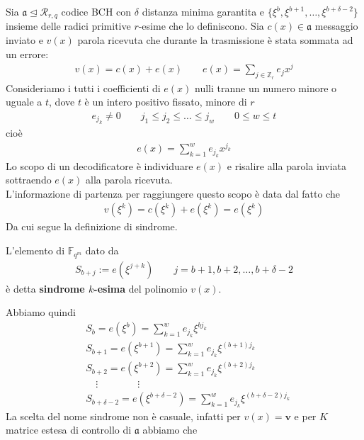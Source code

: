 Sia $\mathfrak{a} \trianglelefteq  \mathcal{R}_{r,q} $ codice BCH con $\delta$ distanza minima garantita e $\lbrace \xi^{b}, \xi^{b+1}, \dots , \xi^{b + \delta - 2} \rbrace$ insieme delle radici primitive $r$-esime che lo definiscono. Sia $c(x) \in \mathfrak{a}$ messaggio inviato e $v(x)$ parola ricevuta che durante la trasmissione è stata sommata ad un errore:
\begin{align*}
   v(x) = c(x) + e(x) \qquad e(x) = \sum_{j \in \mathbb{Z}_{r}} e_{j} x^{j}
\end{align*}
Consideriamo i tutti i coefficienti di $e(x)$ nulli tranne un numero minore o uguale a $t$, dove $t$ è un intero positivo fissato, minore di $r$
\begin{align*}
   e_{j_{k}} \neq 0 \qquad j_{1} \leq j_{2} \leq \dots \leq j_{w} \qquad 0 \leq w \leq t
\end{align*}
cioè
\begin{align*}
   e(x) =  \sum_{k=1}^{w} e_{j_{k}} x^{j_{k}}
\end{align*}
Lo scopo di un decodificatore è individuare $e(x)$ e risalire alla parola inviata sottraendo $e(x)$ alla parola ricevuta.\\
L'informazione di partenza per raggiungere questo scopo è data dal fatto che
\begin{align*}
   v(\xi^{k}) = c(\xi^{k}) + e(\xi^{k}) = e(\xi^{k})
\end{align*}
Da cui segue la definizione di sindrome.
\begin{definizione}
   L'elemento di $\mathbb{F}_{q^m}$ dato da
   \begin{align*}
      S_{b+j} := e(\xi^{j+ k}) \qquad j = b+1, b+2, \dots, b + \delta - 2
   \end{align*}
   è detta {\bf sindrome $k$-esima} del polinomio $v(x)$.
\end{definizione}
Abbiamo quindi
\begin{align*}
   &S_{b} = e(\xi^{b}) = \sum_{k=1}^{w} e_{j_{k}} \xi^{b j_{k}} \\
   &S_{b+1} = e(\xi^{b+ 1}) = \sum_{k=1}^{w} e_{j_{k}} \xi^{(b+1) j_{k}} \\
   &S_{b+2} = e(\xi^{b+ 2}) = \sum_{k=1}^{w} e_{j_{k}} \xi^{(b+2) j_{k}} \\
   & \quad \vdots \qquad \qquad \vdots \\
   &S_{b + \delta - 2} = e(\xi^{ b +\delta - 2}) = \sum_{k=1}^{w} e_{j_{k}} \xi^{(b +\delta - 2) j_{k}}
\end{align*}
La scelta del nome sindrome non è casuale, infatti per $v(x) = \mathbf{v}$ e per $K$ matrice estesa di controllo di $\mathfrak{a}$ abbiamo che

